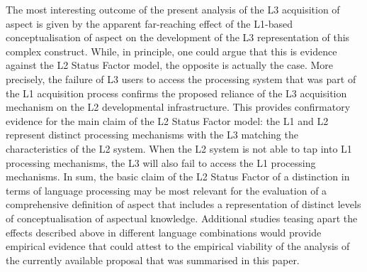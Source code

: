 \documentclass[output=paper,modfonts,nonflat,newtxmath]{langsci/langscibook}
\begin{document}
The most interesting outcome of the present analysis of the L3 acquisition of aspect is given by the apparent far-reaching effect of the L1-based conceptualisation of aspect on the development of the L3 representation of this complex construct. While, in principle, one could argue that this is evidence against the L2 Status Factor model, the opposite is actually the case. More precisely, the failure of L3 users to access the processing system that was part of the L1 acquisition process confirms the proposed reliance of the L3 acquisition mechanism on the L2 developmental infrastructure.  This provides confirmatory evidence for the main claim of the L2 Status Factor model: the L1 and L2 represent distinct processing mechanisms with the L3 matching the characteristics of the L2 system. When the L2 system is not able to tap into L1 processing mechanisms, the L3 will also fail to access the L1 processing mechanisms. In sum, the basic claim of the L2 Status Factor of a distinction in terms of language processing may be most relevant for the evaluation of a comprehensive definition of aspect that includes a representation of distinct levels of conceptualisation of aspectual knowledge. Additional studies teasing apart the effects described above in different language combinations would provide empirical evidence that could attest to the empirical viability of the analysis of the currently available proposal that was summarised in this paper.

{\sloppy\printbibliography[heading=subbibliography,notkeyword=this]}
\end{document}
